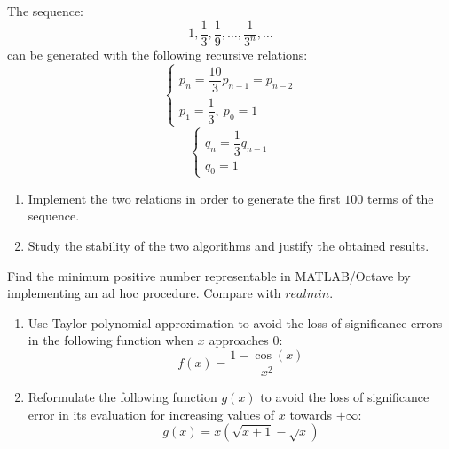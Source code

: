 \documentclass[12pt, a4paper]{report}
\newtheorem[style=M,bodystyle=\normalfont]{theorem}{Theorem}
\newtheorem[style=M,bodystyle=\normalfont]{corollary}{Corollary}
\newtheorem[style=M,bodystyle=\normalfont]{lemma}{Lemma}
\newtheorem[style=M,bodystyle=\normalfont]{definition}{Definition}
\begin{document}
    \begin{Exercise}[label=8]
        The sequence: 
        \[1, \dfrac{1}{3}, \dfrac{1}{9}, \dots, \dfrac{1}{3^n},\dots\]
        can be generated with the following recursive relations: 
        \[
        \begin{cases}
            p_n=\dfrac{10}{3}p_{n-1}=p_{n-2}  \\
            p_1 = \dfrac{1}{3}, \: p_0=1
        \end{cases}
        \]
        \[
        \begin{cases}
            q_n=\dfrac{1}{3}q_{n-1}  \\
            q_0=1
        \end{cases}
        \]
        \begin{enumerate}
            \item Implement the two relations in order to generate the first $100$ terms of the sequence.
            \item Study the stability of the two algorithms and justify the obtained results. 
        \end{enumerate}
    \end{Exercise}
    \begin{Answer}[ref=8]
        
    \end{Answer}

    \newpage

    \begin{Exercise}[label=9]
        Find the minimum positive number representable in MATLAB/Octave by implementing an ad hoc procedure. Compare with $realmin$.
    \end{Exercise}
    \begin{Answer}[ref=9]
        
    \end{Answer}

    \newpage

    \begin{Exercise}[label=10]
        \begin{enumerate}
            \item Use Taylor polynomial approximation to avoid the loss of significance errors in the following function when $x$ approaches $0$:
                \[f(x)=\dfrac{1-\cos(x)}{x^2}\]
            \item Reformulate the following function $g(x)$ to avoid the loss of significance error in its evaluation for increasing values of $x$ towards $+ \infty$:
                \[g(x)=x \left( \sqrt{x+1} - \sqrt{x} \right)\]
        \end{enumerate}
    \end{Exercise}
    \begin{Answer}[ref=10]
        
    \end{Answer}
\end{document}
